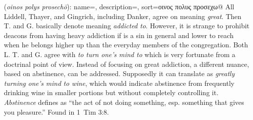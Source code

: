\item[Wine abstinence,]

(\textit{oinos polys prosechō}):
{
    name=,
    description={},
    sort=οινος πολυς προσεχω@
}
All Liddell, Thayer, and Gingrich, including Danker, agree on  meaning \emph{great}. Then T. and G. basically denote  meaning \emph{addicted to}. However, it is strange to prohibit deacons from having heavy addiction if  is a sin in general and lower to reach when he belongs higher up than the everyday members of the congregation. Both L. T. and G. agree with \emph{to turn one's mind to} which is very fortunate from a doctrinal point of view. Instead of focusing on great addiction, a different nuance, based on abstinence, can be addressed. Supposedly it can translate as \emph{greatly turning one's mind to wine}, which would indicate abstinence from frequently drinking wine in smaller portions but without completely controlling it. \emph{Abstinence} defines as ``the act of not doing something, esp. something that gives you pleasure.''
Found in 1~Tim 3:8.
